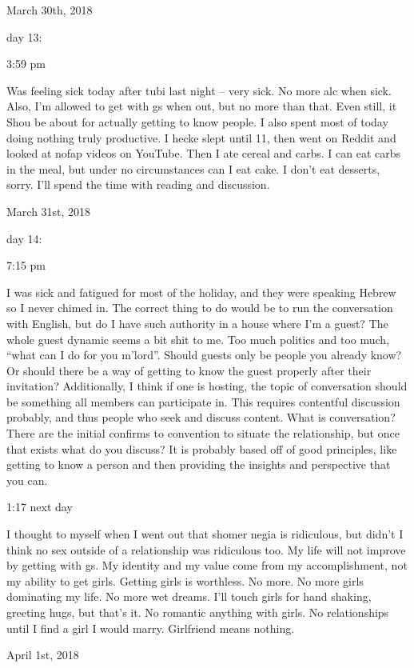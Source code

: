 \bigskip
\bigskip
March 30th, 2018

day 13:

3:59 pm

Was feeling sick today after tubi last night -- very sick. No more alc
when sick. Also, I'm allowed to get with gs when out, but no more than
that. Even still, it Shou be about for actually getting to know people.
I also spent most of today doing nothing truly productive. I hecke slept
until 11, then went on Reddit and looked at nofap videos on YouTube.
Then I ate cereal and carbs. I can eat carbs in the meal, but under no
circumstances can I eat cake. I don't eat desserts, sorry. I'll spend
the time with reading and discussion.

\bigskip
\bigskip
March 31st, 2018

day 14:

7:15 pm

I was sick and fatigued for most of the holiday, and they were speaking
Hebrew so I never chimed in. The correct thing to do would be to run the
conversation with English, but do I have such authority in a house where
I'm a guest? The whole guest dynamic seems a bit shit to me. Too much
politics and too much, ``what can I do for you m'lord''. Should guests
only be people you already know? Or should there be a way of getting to
know the guest properly after their invitation? Additionally, I think if
one is hosting, the topic of conversation should be something all
members can participate in. This requires contentful discussion
probably, and thus people who seek and discuss content. What is
conversation? There are the initial confirms to convention to situate
the relationship, but once that exists what do you discuss? It is
probably based off of good principles, like getting to know a person and
then providing the insights and perspective that you can.

1:17 next day

I thought to myself when I went out that shomer negia is ridiculous, but
didn't I think no sex outside of a relationship was ridiculous too. My
life will not improve by getting with gs. My identity and my value come
from my accomplishment, not my ability to get girls. Getting girls is
worthless. No more. No more girls dominating my life. No more wet
dreams. I'll touch girls for hand shaking, greeting hugs, but that's it.
No romantic anything with girls. No relationships until I find a girl I
would marry. Girlfriend means nothing.

\bigskip
\bigskip
April 1st, 2018

